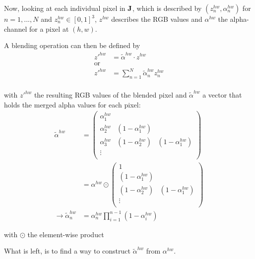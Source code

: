 Now, looking at each individual pixel in $\mathbf{J}$, which is described by $(z^{hw}_n, \alpha^{hw}_n)$ for $n = 1, ..., N$ and $z^{hw}_n \in [0, 1]^{3}$, $z^{hw}$ describes the RGB values and $\alpha^{hw}$ the alpha-channel for a pixel at $(h, w)$.

A blending operation can then be defined by
\begin{align}
    z'^{hw} & = \tilde{\alpha}^{hw} \cdot z^{hw} \\
    \text{or} \\
    z'^{hw} & = \sum_{n=1}^N \tilde{\alpha}^{hw}_n  z^{hw}_n \\
\end{align}

with $z'^{hw}$ the resulting RGB values of the blended pixel and $\tilde{\alpha}^{hw}$ a vector that holds the merged alpha values for each pixel:
\begin{align}
    \tilde{\alpha}^{hw} & =
    \begin{pmatrix}
        \alpha^{hw}_1 & &\\
        \alpha^{hw}_2 & (1 - \alpha^{hw}_1) &\\
        \alpha^{hw}_3 & (1 - \alpha^{hw}_2) & (1 - \alpha^{hw}_1)\\
        \vdots & &\\
    \end{pmatrix}
    \\
    & = \alpha^{hw} \odot 
    \begin{pmatrix}
        1  &\\
        (1 - \alpha^{hw}_1) &\\
        (1 - \alpha^{hw}_2) & (1 - \alpha^{hw}_1)\\
        \vdots &\\
    \end{pmatrix}
    \\
    \rightarrow  \tilde{\alpha}^{hw}_n & = \alpha^{hw}_n \prod^{n-1}_{i=1} (1 - \alpha^{hw}_i)
\end{align}

with $\odot$ the element-wise product

What is left, is to find a way to construct $\tilde{\alpha}^{hw}$ from $\alpha^{hw}$.

